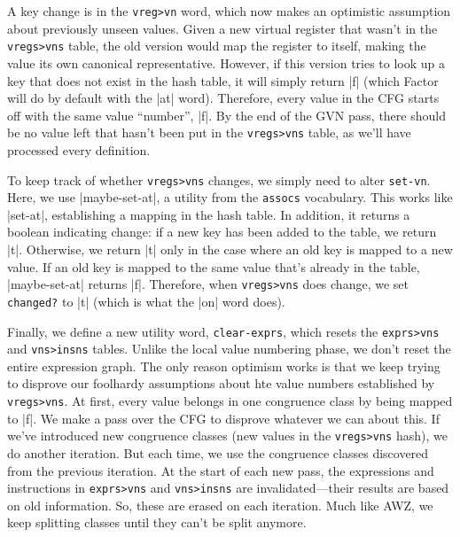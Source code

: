 
A key change is in the \Verb|vreg>vn| word, which now makes an optimistic
assumption about previously unseen values.  Given a new virtual register that
wasn't in the \Verb|vregs>vns| table, the old version would map the register
to itself, making the value its own canonical representative.  However, if this
version tries to look up a key that does not exist in the hash table, it will
simply return \factor|f| (which Factor will do by default with the \factor|at|
word).  Therefore, every value in the \gls{CFG} starts off with the same value
``number'', \factor|f|.  By the end of the \gls{GVN} pass, there should be no
value left that hasn't been put in the \Verb|vregs>vns| table, as we'll have
processed every definition.

To keep track of whether \Verb|vregs>vns| changes, we simply need to alter
\Verb|set-vn|.  Here, we use \factor|maybe-set-at|, a utility from the
\Verb|assocs| vocabulary.  This works like \factor|set-at|, establishing a
mapping in the hash table.  In addition, it returns a boolean indicating
change: if a new key has been added to the table, we return \factor|t|.
Otherwise, we return \factor|t| only in the case where an old key is mapped to
a new value.  If an old key is mapped to the same value that's already in the
table, \factor|maybe-set-at| returns \factor|f|.  Therefore, when
\Verb|vregs>vns| does change, we set \Verb|changed?| to \factor|t| (which
is what the \factor|on| word does).

Finally, we define a new utility word, \Verb|clear-exprs|, which resets the
\Verb|exprs>vns| and \Verb|vns>insns| tables.  Unlike the local value numbering
phase, we don't reset the entire expression graph.  The only reason optimism
works is that we keep trying to disprove our foolhardy assumptions about hte
value numbers established by \Verb|vregs>vns|.  At first, every value belongs
in one congruence class by being mapped to \factor|f|.  We make a pass over the
\gls{CFG} to disprove whatever we can about this.  If we've introduced new
congruence classes (new values in the \Verb|vregs>vns| hash), we do another
iteration.  But each time, we use the congruence classes discovered from the
previous iteration.  At the start of each new pass, the expressions and
instructions in \Verb|exprs>vns| and \Verb|vns>insns| are invalidated---their
results are based on old information.  So, these are erased on each iteration.
Much like AWZ, we keep splitting classes until they can't be split anymore.

